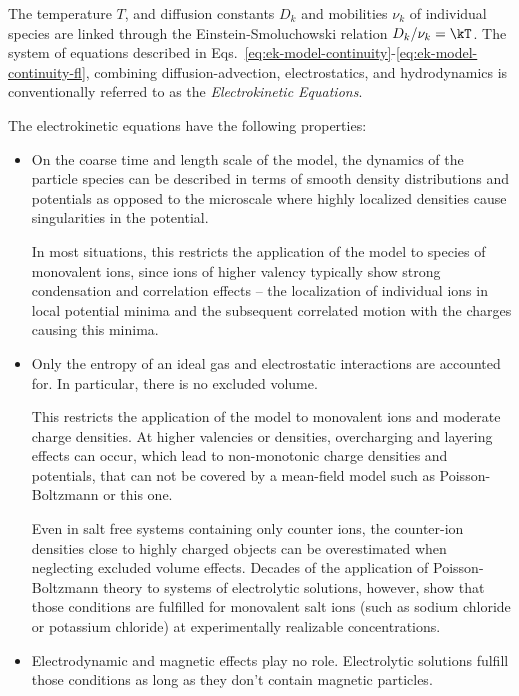 The temperature $T$, and diffusion constants $D_k$ and mobilities $\nu_k$ of
individual species are linked through the Einstein-Smoluchowski relation $D_k /
\nu_k = \kT$. The system of equations described in
Eqs.~\eqref{eq:ek-model-continuity}-\eqref{eq:ek-model-continuity-fl}, combining 
diffusion-advection, electrostatics, and hydrodynamics is conventionally 
referred to as the \textit{Electrokinetic Equations}.


The electrokinetic equations have the following properties:
\begin{itemize}
	\item On the coarse time and length scale of the model, the dynamics of the
	particle species can be described in terms of smooth density distributions and
	potentials as opposed to the microscale where highly localized densities cause
	singularities in the potential.
	
	In most situations, this restricts the application of the model to species of
	monovalent ions, since ions of higher valency typically show strong
	condensation and correlation effects -- the localization of individual ions in
	local potential minima and the subsequent correlated motion with the charges
	causing this minima.
	
	\item Only the entropy of an ideal gas and electrostatic interactions are
	accounted for. In particular, there is no excluded volume.
	
	This restricts the application of the model to monovalent ions and moderate
  charge densities. At higher valencies or densities, overcharging and layering
  effects can occur, which lead to non-monotonic charge densities and potentials,
  that can not be covered by a mean-field model such as Poisson-Boltzmann or this
  one.
	
	Even in salt free systems containing only counter ions, the counter-ion
	densities close to highly charged objects can be overestimated when neglecting
	excluded volume effects. Decades of the application of Poisson-Boltzmann
	theory to systems of electrolytic solutions, however, show that those
	conditions are fulfilled for monovalent salt ions (such as sodium chloride or
	potassium chloride) at experimentally realizable concentrations.
	
	\item Electrodynamic and magnetic effects play no role. Electrolytic solutions
	fulfill those conditions as long as they don't contain magnetic particles.
	

\end{itemize}
